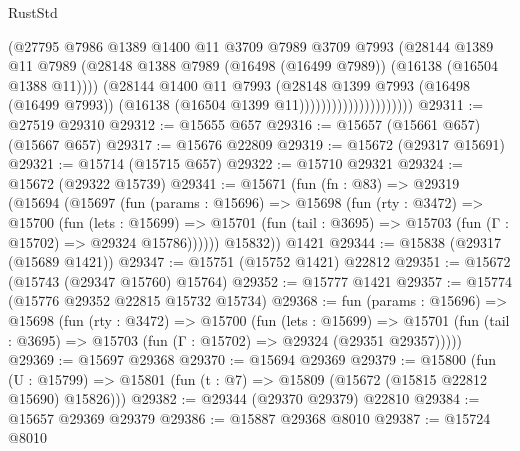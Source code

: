 \begin{lexlean}{RustStd}
\begin{coremodule}
                                    (@27795
                                      @7986
                                      @1389
                                      @1400
                                      @11
                                      @3709
                                      @7989
                                      @3709
                                      @7993
                                      (@28144
                                        @1389
                                        @11
                                        @7989
                                        (@28148
                                          @1388
                                          @7989
                                          (@16498 (@16499 @7989))
                                          (@16138 (@16504 @1388 @11))))
                                      (@28144
                                        @1400
                                        @11
                                        @7993
                                        (@28148
                                          @1399
                                          @7993
                                          (@16498 (@16499 @7993))
                                          (@16138 (@16504 @1399 @11)))))))))))))))))))))
@29311 := @27519 @29310
@29312 := @15655 @657
@29316 := @15657 (@15661 @657) (@15667 @657)
@29317 := @15676 @22809
@29319 := @15672 (@29317 @15691)
@29321 := @15714 (@15715 @657)
@29322 := @15710 @29321
@29324 := @15672 (@29322 @15739)
@29341 := @15671
    (fun (fn : @83) =>
    @29319
      (@15694
        (@15697
          (fun (params : @15696) =>
          @15698
            (fun (rty : @3472) =>
            @15700
              (fun (lets : @15699) =>
              @15701 (fun (tail : @3695) => @15703 (fun (Γ : @15702) => @29324 @15786))))))
        @15832))
    @1421
@29344 := @15838 (@29317 (@15689 @1421))
@29347 := @15751 (@15752 @1421) @22812
@29351 := @15672 (@15743 (@29347 @15760) @15764)
@29352 := @15777 @1421
@29357 := @15774 (@15776 @29352 @22815 @15732 @15734)
@29368 := fun (params : @15696) =>
  @15698
    (fun (rty : @3472) =>
    @15700
      (fun (lets : @15699) =>
      @15701 (fun (tail : @3695) => @15703 (fun (Γ : @15702) => @29324 (@29351 @29357)))))
@29369 := @15697 @29368
@29370 := @15694 @29369
@29379 := @15800
    (fun (U : @15799) => @15801 (fun (t : @7) => @15809 (@15672 (@15815 @22812 @15690) @15826)))
@29382 := @29344 (@29370 @29379) @22810
@29384 := @15657 @29369 @29379
@29386 := @15887 @29368 @8010
@29387 := @15724 @8010

\end{coremodule}
\end{lexlean}

